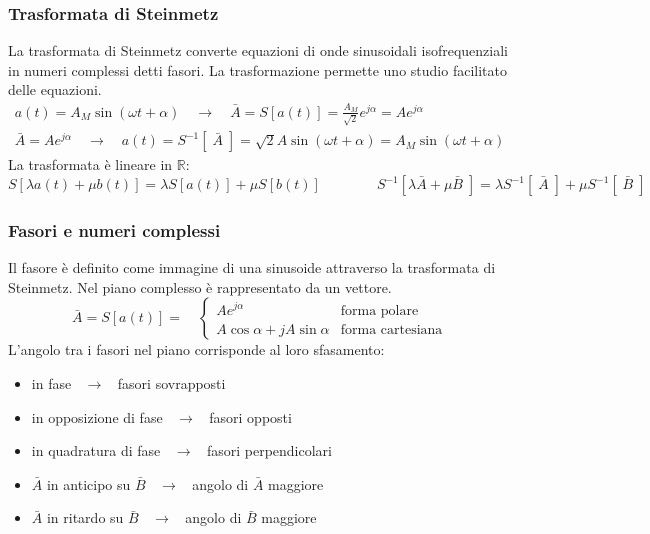 \documentclass[a4paper]{article}
\begin{document}
\subsubsection*{Trasformata di Steinmetz}
La trasformata di Steinmetz converte equazioni di onde sinusoidali isofrequenziali in numeri complessi detti fasori. La trasformazione
permette uno studio facilitato delle equazioni.
\begin{align*}
	a(t) = A_M \sin (\omega t + \alpha) \quad \rightarrow \quad \bar{A} = S\left[a(t)\right] = \frac{A_M}{\sqrt{2}} e^{j\alpha} = Ae^{j\alpha} \\
	\bar{A} = Ae^{j\alpha} \quad \rightarrow \quad a(t) = S^{-1}\left[\;\bar{A}\;\right] = \sqrt{2} A \sin(\omega t + \alpha) = A_M \sin (\omega t + \alpha)
\end{align*}
La trasformata è lineare in \(\mathbb{R}\):
\[S[\lambda a(t) + \mu b(t)] = \lambda S[a(t)] + \mu S[b(t)] \qquad\qquad S^{-1}\left[\lambda\bar{A} + \mu\bar{B}\;\right] = \lambda S^{-1}\left[\;\bar{A}\;\right] + \mu S^{-1}\left[\;\bar{B}\;\right]\]

\subsubsection*{Fasori e numeri complessi}
Il fasore è definito come immagine di una sinusoide attraverso la trasformata di Steinmetz. Nel piano complesso è rappresentato da
un vettore.
\[\bar{A} = S[a(t)] = \quad \begin{cases} Ae^{j\alpha} &\text{forma polare} \\ A\cos\alpha + jA\sin\alpha &\text{forma cartesiana}\end{cases}\]
L'angolo tra i fasori nel piano corrisponde al loro sfasamento:
\begin{center}
	\begin{minipage}{0.5\textwidth}
		\begin{itemize}
			\item in fase \(\;\; \rightarrow \;\;\) fasori sovrapposti
			\item in opposizione di fase \(\;\; \rightarrow \;\;\) fasori opposti
			\item in quadratura di fase \(\;\; \rightarrow \;\;\) fasori perpendicolari
		\end{itemize}
	\end{minipage}
	\begin{minipage}{0.49\textwidth}
		\begin{itemize}
			\item \(\bar{A}\) in anticipo su \(\bar{B}\) \(\;\; \rightarrow \;\;\) angolo di \(\bar{A}\) maggiore
			\item \(\bar{A}\) in ritardo su \(\bar{B}\) \(\;\; \rightarrow \;\;\) angolo di \(\bar{B}\) maggiore
		\end{itemize}
	\end{minipage}
\end{center}
\end{document}
